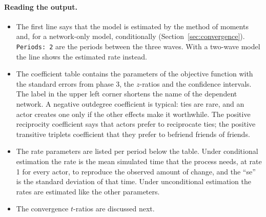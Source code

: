 \paragraph{Reading the output.}
\begin{itemize}[nosep]
  \item The first line says that the model is estimated by the method of moments and, for a network-only model, conditionally (Section~\ref{sec:convergence}). \texttt{Periods: 2} are the periods between the three waves. With a two-wave model the line shows the estimated rate instead.
  \item The coefficient table contains the parameters of the objective function with the standard errors from phase 3, the $z$-ratios and the confidence intervals. The label in the upper left corner shortens the name of the dependent network. A negative outdegree coefficient is typical: ties are rare, and an actor creates one only if the other effects make it worthwhile. The positive reciprocity coefficient says that actors prefer to reciprocate ties; the positive transitive triplets coefficient that they prefer to befriend friends of friends.
  \item The rate parameters are listed per period below the table. Under conditional estimation the rate is the mean simulated time that the process needs, at rate 1 for every actor, to reproduce the observed amount of change, and the ``se'' is the standard deviation of that time. Under unconditional estimation the rates are estimated like the other parameters.
  \item The convergence $t$-ratios are discussed next.
\end{itemize}


